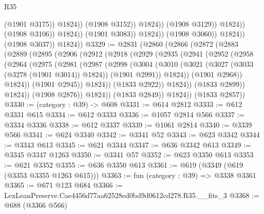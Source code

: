\begin{lexlean}{R35}
\begin{coremodule}
                                              (@1901 @3175))
                                            @1824))
                                        (@1908 @3152))
                                      @1824))
                                  (@1908 @3129))
                                @1824))
                            (@1908 @3106))
                          @1824))
                      (@1901 @3083))
                    @1824))
                (@1908 @3060))
              @1824))
          (@1908 @3037))
        @1824))
@3329 := @2831
    (@2860
      (@2866
        (@2872
          (@2883
            (@2889
              (@2895
                (@2906
                  (@2912
                    (@2918
                      (@2929
                        (@2935
                          (@2941
                            (@2952
                              (@2958
                                (@2964
                                  (@2975
                                    (@2981
                                      (@2987
                                        (@2998
                                          (@3004
                                            (@3010
                                              (@3021
                                                (@3027 (@3033 (@3278 (@1901 @3014)) @1824))
                                                (@1901 @2991))
                                              @1824))
                                          (@1901 @2968))
                                        @1824))
                                    (@1901 @2945))
                                  @1824))
                              (@1833 @2922))
                            @1824))
                        (@1833 @2899))
                      @1824))
                  (@1908 @2876))
                @1824))
            (@1833 @2849))
          @1824))
      (@1833 @2857))
@3330 := (category : @39) -> @608
@3331 := @614 @2812
@3333 := @612 @3331 @615
@3334 := @612 @3333
@3336 := @1057 @2814 @566
@3337 := @3334 @3336
@3338 := @612 @3337
@3339 := @1061 @2814
@3340 := @3339 @566
@3341 := @624 @3340
@3342 := @3341 @52
@3343 := @623 @3342
@3344 := @3343 @613
@3345 := @621 @3344
@3347 := @636 @3342 @613
@3349 := @3345 @3347 @1263
@3350 := @3341 @57
@3352 := @623 @3350 @613
@3353 := @621 @3352
@3355 := @636 @3350 @613
@3361 := @619 (@3349 (@619 (@3353 @3355 @1263 @615)))
@3363 := fun (category : @39) => @3338 @3361
@3365 := @671 @123 @684
@3366 := LexLeanPreserve.Cae4456d77aa62528ed0bd9d0612cd278.R35.__fits_3
@3368 := @688 (@3366 @566)

\end{coremodule}
\end{lexlean}
